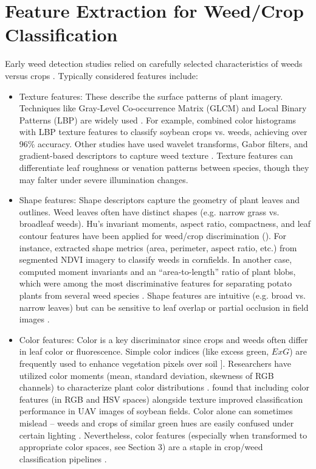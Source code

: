 \documentclass[letterpaper]{report}
\begin{document}
\section{Feature Extraction for Weed/Crop Classification}  
Early weed detection studies relied on carefully selected  characteristics of weeds versus crops \parencite{Wu2021-gt}. Typically considered features include:  

\begin{itemize}
	\item{Texture features: These describe the surface patterns of plant imagery. Techniques like Gray-Level Co-occurrence Matrix (\gls{GLCM}) and Local Binary Patterns (\gls{LBP}) are widely used \parencite{Mekhalfa2021-np}. For example, \citeauthor{Mekhalfa2021-np} combined color histograms with LBP texture features to classify soybean crops vs. weeds, achieving over 96\% accuracy. Other studies have used wavelet transforms, Gabor filters, and gradient-based descriptors to capture weed texture \parencite{Wu2021-gt}. Texture features can differentiate leaf roughness or venation patterns between species, though they may falter under severe illumination changes.}  

	\item{Shape features: Shape descriptors capture the geometry of plant leaves and outlines. Weed leaves often have distinct shapes (e.g. narrow grass vs. broadleaf weeds). Hu’s invariant moments, aspect ratio, compactness, and leaf contour features have been applied for weed/crop discrimination \parencite{Ahsen2024-tr} (\cite{Bazrafkan2024-bl}). For instance, \citeauthor{Bazrafkan2024-bl} extracted shape metrics (area, perimeter, aspect ratio, etc.) from segmented NDVI imagery to classify weeds in cornfields. In another case, \citeauthor{Sabzi2020-af} computed moment invariants and an “area-to-length” ratio of plant blobs, which were among the most discriminative features for separating potato plants from several weed species \parencite{Sabzi2020-af}. Shape features are intuitive (e.g. broad vs. narrow leaves) but can be sensitive to leaf overlap or partial occlusion in field images \parencite{Sabzi2020-af}. }

	\item{Color features: Color is a key discriminator since crops and weeds often differ in leaf color or fluorescence. Simple color indices (like excess green, $ExG$) are frequently used to enhance vegetation pixels over soil ]. Researchers have utilized color moments (mean, standard deviation, skewness of RGB channels) to characterize plant color distributions \parencite{Wu2021-gt}.  \citeauthor{Mekhalfa2021-np} found that including color features (in RGB and HSV spaces) alongside texture improved classification performance in UAV images of soybean fields. Color alone can sometimes mislead – weeds and crops of similar green hues are easily confused under certain lighting \parencite{Wu2021-gt}. Nevertheless, color features (especially when transformed to appropriate color spaces, see Section 3) are a staple in crop/weed classification pipelines \parencite{Sabzi2020-af}.  }


\end{itemize}
\end{document}
